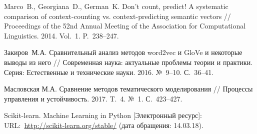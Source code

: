 \documentclass[14pt]{matmex-diploma-custom}
\begin{document}
\begin{thebibliography}{99}
	   Marco~B., Georgiana~D., German~K. Don’t count, predict! A systematic comparison of context-counting vs. context-predicting semantic vectors //  Proceedings of the 52nd Annual Meeting of the Association for Computational Linguistics. 2014. Vol.~1. P.~238--247.
	
	  Закиров~М.\:А. Сравнительный анализ методов word2vec и GloVe и некоторые выводы из него // Современная наука: актуальные проблемы теории и практики. Серия: Естественные и технические науки. 2016. №~9--10. С.~36--41.
	
	 Масловская М.\:А. Сравнение методов тематического моделирования // Процессы управления и устойчивость. 2017. T.~4. №~1. С.~423--427.
	
	  Scikit-learn. Machine Learning in Python [Электронный ресурс]: URL:~\url{http://scikit-learn.org/stable/} (дата обращения: 14.03.18).
	
\end{thebibliography}
\end{document}
